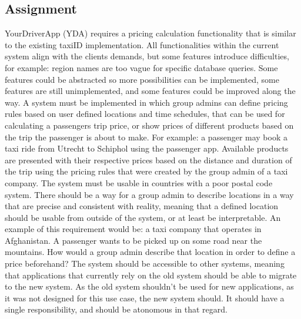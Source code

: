 \subsection{Assignment}
YourDriverApp (YDA) requires a pricing calculation functionality that is similar to the existing taxiID implementation. All functionalities within the current system align with the clients demands, but some features introduce difficulties, for example: region names are too vague for specific database queries. Some features could be abstracted so more possibilities can be implemented, some features are still unimplemented, and some features could be improved along the way. A system must be implemented in which group admins can define pricing rules based on user defined locations and time schedules, that can be used for calculating a passengers trip price, or show prices of different products based on the trip the passenger is about to make. For example: a passenger may book a taxi ride from Utrecht to Schiphol using the passenger app. Available products are presented with their respective prices based on the distance and duration of the trip using the pricing rules that were created by the group admin of a taxi company. The system must be usable in countries with a poor postal code system. There should be a way for a group admin to describe locations in a way that are precise and consistent with reality, meaning that a defined location should be usable from outside of the system, or at least be interpretable. An example of this requirement would be: a taxi company that operates in Afghanistan. A passenger wants to be picked up on some road near the mountains. How would a group admin describe that location in order to define a price beforehand? The system should be accessible to other systems, meaning that applications that currently rely on the old system should be able to migrate to the new system. As the old system shouldn't be used for new applications, as it was not designed for this use case, the new system should. It should have a single responsibility, and should be atonomous in that regard.

